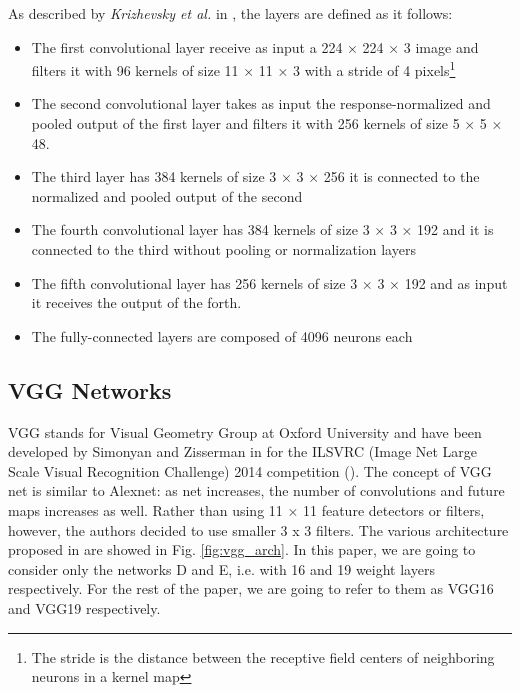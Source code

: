 As described by \textit{Krizhevsky et al.} in \cite{NIPS2012_c399862d}, the layers are defined as it follows:

\begin{itemize}
\item The first convolutional layer receive as input a 224 × 224 × 3  image and filters it with 96 kernels of size 11 × 11 × 3 with a stride of 4 pixels\footnote{The stride is the distance between the receptive field centers of neighboring neurons in a kernel map}
\item The second convolutional layer takes as input the response-normalized and pooled output of the first layer and filters it with 256 kernels of size 5 × 5 × 48.
\item The third layer has 384 kernels of size 3 × 3 × 256 it is connected to the normalized and pooled output of the second
\item The fourth convolutional layer has 384 kernels of size 3 × 3 × 192 and it is connected to the third without pooling or normalization layers
\item The fifth convolutional layer has 256 kernels of size 3 × 3 × 192 and as input it receives the output of the forth. 
\item The fully-connected layers are composed of 4096 neurons each
\end{itemize}
\subsection{VGG Networks}\label{sec:VGG}
VGG stands for Visual Geometry Group at Oxford University and have been developed by Simonyan and Zisserman in \cite{simonyan2015deep} for the 
ILSVRC (Image Net Large Scale Visual Recognition Challenge) 2014 competition
(\cite{DBLP:journals/corr/RussakovskyDSKSMHKKBBF14}). 
The concept of VGG net is similar to Alexnet: as net increases, the number of convolutions and future maps increases as well. Rather than using 11 × 11 feature detectors or filters, however, the authors decided to use smaller 3 x 3  filters. The various architecture proposed in \cite{simonyan2015deep} are showed in Fig. \ref{fig:vgg_arch}. In this paper, we are going to consider only the networks D and E, i.e. with 16 and 19 weight layers respectively. For the rest of the paper, we are going to refer to them as VGG16 and VGG19 respectively. 

